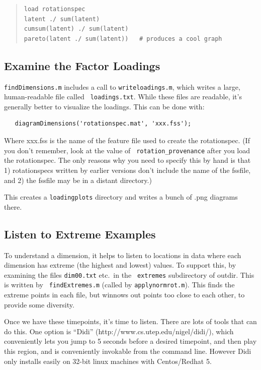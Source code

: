 \documentclass[11pt]{article}
\begin{document}
\begin{quote}
\begin{verbatim}
load rotationspec
latent ./ sum(latent) 
cumsum(latent) ./ sum(latent) 
pareto(latent ./ sum(latent))   # produces a cool graph
\end{verbatim}
\end{quote}


\subsection{Examine the Factor Loadings}

{\tt findDimensions.m} includes a call to {\tt writeloadings.m}, which
writes a large, human-readable file called {\tt
  loadings.txt}.  While these files are readable, it's generally better
to visualize the loadings.  This can be done with:

\begin{verbatim}
   diagramDimensions('rotationspec.mat', 'xxx.fss');
\end{verbatim}

Where xxx.fss is the name of the feature file used to create the
rotationspec.  (If you don't remember, look at the value of {\tt
  rotation\_provenance} after you load the rotationspec.  The only
reasons why you need to specify this by hand is that 1) rotationspecs
written by earlier versions don't include the name of the fssfile, and
2) the fssfile may be in a distant directory.)

This creates a {\tt loadingplots} directory and writes a bunch of
.png diagrams there. 

\subsection{Listen to Extreme Examples}

To understand a dimension, it helps to listen to locations in data
where each dimension has extreme (the highest and lowest) values.  To
support this, by examining the files {\tt dim00.txt} etc.\ in the {\tt
  extremes} subdirectory of outdir.  This is written by {\tt
  findExtremes.m} (called by {\tt applynormrot.m}).  This finds the
extreme points in each file, but winnows out points too close to each
other, to provide some diversity.

Once we have these timepoints, it's time to listen.  There are lots of
tools that can do this.  One option is ``Didi''
(http://www.cs.utep.edu/nigel/didi/), which conveniently lets you jump
to 5 seconds before a desired timepoint, and then play this region, and
is conveniently invokable from the command line.  However Didi only
installs easily on 32-bit linux machines with Centos/Redhat 5.
\end{document}
